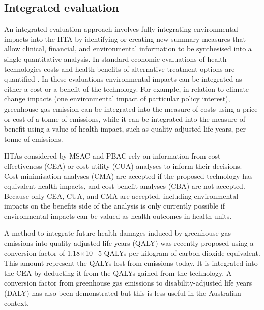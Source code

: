 \begin{refsection}
\subsection{Integrated evaluation}
An integrated evaluation approach involves fully integrating environmental impacts into the HTA by identifying or creating new summary measures that allow clinical, financial, and environmental information to be synthesised into a single quantitative analysis.\cite{toolan_environmental_2023} In standard economic evaluations of health technologies costs and health benefits of alternative treatment options are quantified . In these evaluations environmental impacts can be integrated as either a cost or a benefit of the technology. For example, in relation to climate change impacts (one environmental impact of particular policy interest), greenhouse gas emission can be integrated into the measure of costs using a price or cost of a tonne of emissions, while it can be integrated into the measure of benefit using a value of health impact, such as quality adjusted life years,\cite{ducrot_integrating_2025} per tonne of emissions.

HTAs considered by MSAC and PBAC rely on information from cost-effectiveness (CEA) or cost-utility (CUA) analyses to inform their decisions.\cite{australian_government_department_of_health_disability_and_ageing_guidelines_2021, australian_government_department_of_health_disability_and_ageing_guidelines_2016} Cost-minimisation analyses (CMA) are accepted if the proposed technology has equivalent health impacts, and cost-benefit analyses (CBA) are not accepted.\cite{australian_government_department_of_health_disability_and_ageing_guidelines_2021, australian_government_department_of_health_disability_and_ageing_guidelines_2016} Because only CEA, CUA, and CMA are accepted, including environmental impacts on the benefits side of the analysis is only currently possible if environmental impacts can be valued as health outcomes in health units. 

A method to integrate future health damages induced by greenhouse gas emissions into quality-adjusted life years (QALY) was recently proposed using a conversion factor of 1.18×10−5 QALYs per kilogram of carbon dioxide equivalent.\cite{ducrot_integrating_2025} This amount represent the QALYs lost from emissions today. It is integrated into the CEA by deducting it from the QALYs gained from the technology. A conversion factor from greenhouse gas emissions to disability-adjusted life years (DALY) has also been demonstrated but this is less useful in the Australian context.\cite{tang_development_2018}


\end{refsection}
